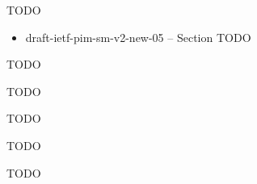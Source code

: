 \documentclass[11pt]{report}
\begin{document}
TODO

\begin{itemize}
  \item draft-ietf-pim-sm-v2-new-05 -- Section TODO
\end{itemize}

TODO

TODO

TODO

TODO

TODO


% 
% 
\end{document}
